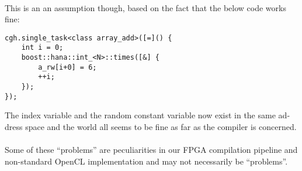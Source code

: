 \begin{otherlanguage}{english}
                                         \\
                                         This is an an assumption though, based
                                         on the fact that the below code works
                                         fine:
                                         \begin{code}
                                             \begin{verbatim}
cgh.single_task<class array_add>([=]() {
    int i = 0;
    boost::hana::int_<N>::times([&] {
        a_rw[i+0] = 6;
        ++i;
    });
});
                                             \end{verbatim}
                                         \end{code}
                                         The index variable and the random
                                         constant variable now exist in the same
                                         address space and the world all seems
                                         to be fine as far as the compiler is
                                         concerned.
                                         \\
                                         \\
                                         Some of these ``problems'' are
                                         peculiarities in our FPGA compilation
                                         pipeline and non-standard OpenCL
                                         implementation and may not necessarily
                                         be ``problems''.
\end{otherlanguage}
